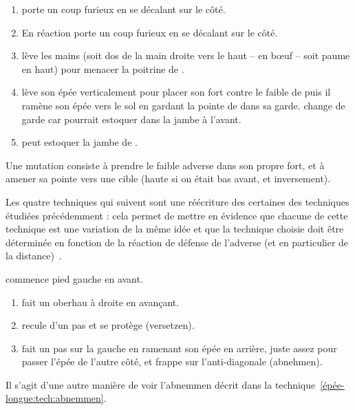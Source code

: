 \begin{technique}[Mutation]

\begin{enumerate}
	\item \A porte un coup furieux en se décalant sur le côté.
	
	\item En réaction \D porte un coup furieux en se décalant sur le côté.
	
	\item \D lève les mains (soit dos de la main droite vers le haut – en bœuf – soit paume en haut) pour menacer la poitrine de \A.
	
	\item \A lève son épée verticalement pour placer son fort contre le faible de \D puis il ramène son épée vers le sol en gardant la pointe de \D dans sa garde. \A change de garde car \D pourrait estoquer dans la jambe à l'avant.
	
	\item \A peut estoquer la jambe de \D.
\end{enumerate}

Une mutation consiste à prendre le faible adverse dans son propre fort, et à amener sa pointe vers une cible (haute si on était bas avant, et inversement).

\end{technique}

\bigskip

Les quatre techniques qui suivent sont une réécriture des certaines des techniques étudiées précédemment : cela permet de mettre en évidence que chacune de cette technique est une variation de la même idée et que la technique choisie doit être déterminée en fonction de la réaction de défense de l'adverse (et en particulier de la distance)~\cite{kronenburg:dijon:going_distance:2015}.


\begin{technique}
\label{épée-longue:tech:dg-zufechten-abnemmen}

\A commence pied gauche en avant.

\begin{enumerate}
	\item \A fait un oberhau à droite en avançant.
	\item \D recule d'un pas et se protège (versetzen).
	\item \A fait un pas sur la gauche en ramenant son épée en arrière, juste assez pour passer l'épée de l'autre côté, et frappe sur l'anti-diagonale (abnehmen).
\end{enumerate}

Il s'agit d'une autre manière de voir l'abnemmen décrit dans la technique~\ref{épée-longue:tech:abnemmen}.

\end{technique}


